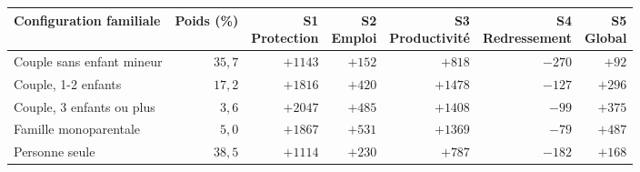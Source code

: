 \begin{tabular}{p{5cm}rrrrrr}\toprule Configuration familiale & Poids (\%) & \makecell{S1\\Protection} & \makecell{S2\\Emploi} & \makecell{S3\\Productivité} & \makecell{S4\\Redressement} & \makecell{S5\\Global}\\ \midrule
Couple sans enfant mineur & $35{,}7$ & $+1143$ & $+152$ & $+818$ & $-270$ & $+92$\\
Couple, 1-2 enfants & $17{,}2$ & $+1816$ & $+420$ & $+1478$ & $-127$ & $+296$\\
Couple, 3 enfants ou plus & $3{,}6$ & $+2047$ & $+485$ & $+1408$ & $-99$ & $+375$\\
Famille monoparentale & $5{,}0$ & $+1867$ & $+531$ & $+1369$ & $-79$ & $+487$\\
Personne seule & $38{,}5$ & $+1114$ & $+230$ & $+787$ & $-182$ & $+168$\\\bottomrule\end{tabular}